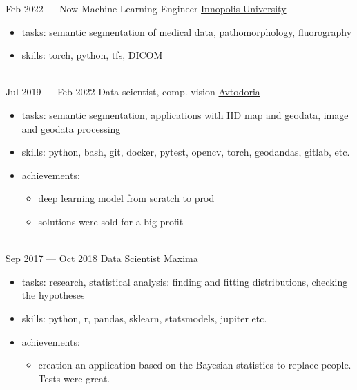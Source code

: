 \documentclass[letterpaper]{twentysecondcv} %
\begin{document}
\begin{twenty} %
        \twentyitem
        {Feb 2022 —}
        {Now}
        {Machine Learning Engineer}
        {\href{https://https://innopolis.university/en/}{Innopolis University}}
        {}
        {
        {\begin{itemize}
            \item tasks: semantic segmentation of medical data, pathomorphology, fluorography
            \item skills: torch, python, tfs, DICOM
        \end{itemize}}
        }
        \\

        \twentyitem
        {Jul 2019 —}
        {Feb 2022}
        {Data scientist, comp. vision}
        {  \href{https://avtodoria.ru/}{Avtodoria}}
        {}
        {
        {\begin{itemize}
            \item tasks: semantic segmentation, applications with HD map and geodata, image and geodata processing
            \item skills: python, bash, git, docker, pytest, opencv, torch, geodandas, gitlab,  etc.
            \item achievements:
            {\begin{itemize}
                \item deep learning model from scratch to prod
                \item solutions were sold for a big profit
            \end{itemize}
            }            
        \end{itemize}}
        }
        \\
        \twentyitem
        {Sep 2017 —}
        {Oct 2018}
        {Data Scientist}
        {\href{http://maxima.life/}{Maxima}}
        {}
        {
        {\begin{itemize}
            \item tasks: research, statistical analysis: finding and fitting distributions, checking the hypotheses
            \item skills: python, r, pandas, sklearn, statsmodels, jupiter etc.
            \item achievements:
            {\begin{itemize}
                \item creation an application based on the Bayesian statistics to replace people. Tests were great.
            \end{itemize}
            }            
        \end{itemize}}
        }
\end{twenty}
\end{document}
